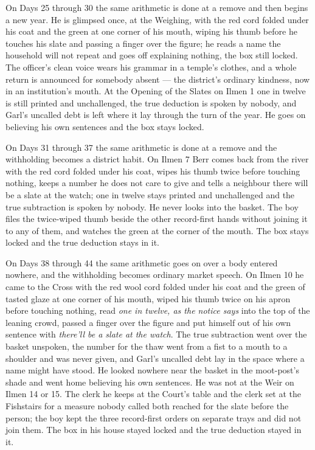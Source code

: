 \documentclass{design/chronicle}
\begin{document}
{On Days 25 through 30 the same arithmetic is done at a remove and then begins a new year. He is glimpsed once, at the Weighing, with the red cord folded under his coat and the green at one corner of his mouth, wiping his thumb before he touches his slate and passing a finger over the figure; he reads a name the household will not repeat and goes off explaining nothing, the box still locked. The officer’s clean voice wears his grammar in a temple’s clothes, and a whole return is announced for somebody absent --- the district’s ordinary kindness, now in an institution’s mouth. At the Opening of the Slates on Ilmen 1 one in twelve is still printed and unchallenged, the true deduction is spoken by nobody, and Garl’s uncalled debt is left where it lay through the turn of the year. He goes on believing his own sentences and the box stays locked.

On Days 31 through 37 the same arithmetic is done at a remove and the withholding becomes a district habit. On Ilmen 7 Berr comes back from the river with the red cord folded under his coat, wipes his thumb twice before touching nothing, keeps a number he does not care to give and tells a neighbour there will be a slate at the watch; one in twelve stays printed and unchallenged and the true subtraction is spoken by nobody. He never looks into the basket. The boy files the twice-wiped thumb beside the other record-first hands without joining it to any of them, and watches the green at the corner of the mouth. The box stays locked and the true deduction stays in it.

On Days 38 through 44 the same arithmetic goes on over a body entered nowhere, and the withholding becomes ordinary market speech. On Ilmen 10 he came to the Cross with the red wool cord folded under his coat and the green of tasted glaze at one corner of his mouth, wiped his thumb twice on his apron before touching nothing, read \emph{one in twelve, as the notice says} into the top of the leaning crowd, passed a finger over the figure and put himself out of his own sentence with \emph{there’ll be a slate at the watch}. The true subtraction went over the basket unspoken, the number for the thaw went from a fist to a mouth to a shoulder and was never given, and Garl’s uncalled debt lay in the space where a name might have stood. He looked nowhere near the basket in the moot-post’s shade and went home believing his own sentences. He was not at the Weir on Ilmen 14 or 15. The clerk he keeps at the Court’s table and the clerk set at the Fishstairs for a measure nobody called both reached for the slate before the person; the boy kept the three record-first orders on separate trays and did not join them. The box in his house stayed locked and the true deduction stayed in it.

}
\end{document}
